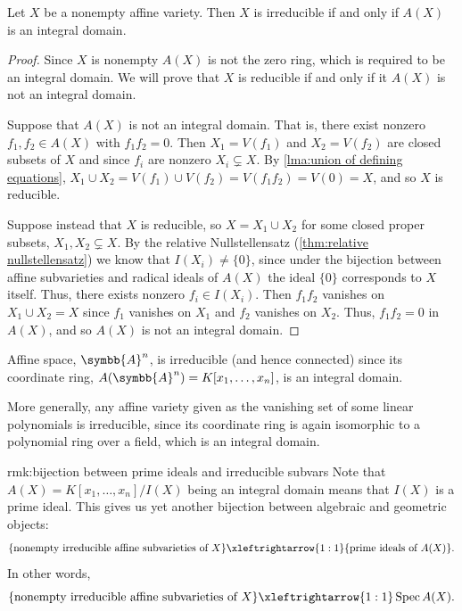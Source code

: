 \documentclass[fleqn]{NotesClass}
\newcommand{\affine}{\symbb{A}}
\DeclareMathOperator{\Spec}{Spec}
\begin{document}
    \begin{prp}{}{}
        Let \(X\) be a nonempty affine variety.
        Then \(X\) is irreducible if and only if \(A(X)\) is an integral domain.
        \begin{proof}
            Since \(X\) is nonempty \(A(X)\) is not the zero ring, which is required to be an integral domain.
            We will prove that \(X\) is reducible if and only if it \(A(X)\) is not an integral domain.
            
            Suppose that \(A(X)\) is not an integral domain.
            That is, there exist nonzero \(f_1, f_2 \in A(X)\) with \(f_1 f_2 = 0\).
            Then \(X_1 = V(f_1)\) and \(X_2 = V(f_2)\) are closed subsets of \(X\) and since \(f_i\) are nonzero \(X_i \subsetneq X\).
            By \cref{lma:union of defining equations}, \(X_1 \cup X_2 = V(f_1) \cup V(f_2) = V(f_1f_2) = V(0) = X\), and so \(X\) is reducible.
            
            Suppose instead that \(X\) is reducible, so \(X = X_1 \cup X_2\) for some closed proper subsets, \(X_1, X_2 \subsetneq X\).
            By the relative Nullstellensatz (\cref{thm:relative nullstellensatz}) we know that \(I(X_i) \ne \{0\}\), since under the bijection between affine subvarieties and radical ideals of \(A(X)\) the ideal \(\{0\}\) corresponds to \(X\) itself.
            Thus, there exists nonzero \(f_i \in I(X_i)\).
            Then \(f_1 f_2\) vanishes on \(X_1 \cup X_2 = X\) since \(f_1\) vanishes on \(X_1\) and \(f_2\) vanishes on \(X_2\).
            Thus, \(f_1 f_2 = 0\) in \(A(X)\), and so \(A(X)\) is not an integral domain.
        \end{proof}
    \end{prp}
    
    \begin{exm}{}{}
        Affine space, \(\affine^n\), is irreducible (and hence connected) since its coordinate ring, \(A(\affine^n) = K[x_1, \dotsc, x_n]\), is an integral domain.
        
        More generally, any affine variety given as the vanishing set of some linear polynomials is irreducible, since its coordinate ring is again isomorphic to a polynomial ring over a field, which is an integral domain.
    \end{exm}
    
    \begin{remark}{}{rmk:bijection between prime ideals and irreducible subvars}
        Note that \(A(X) = K[x_1, \dotsc, x_n] / I(X)\) being an integral domain means that \(I(X)\) is a prime ideal.
        This gives us yet another bijection between algebraic and geometric objects:
        \begin{equation*}
            \{\text{nonempty irreducible affine subvarieties of } X\} \xleftrightarrow{1:1} \{\text{prime ideals of } A(X)\}.
        \end{equation*}
        In other words,
        \begin{equation*}
            \{\text{nonempty irreducible affine subvarieties of } X\} \xleftrightarrow{1:1} \Spec A(X).
        \end{equation*}
    \end{remark}
    
\end{document}
